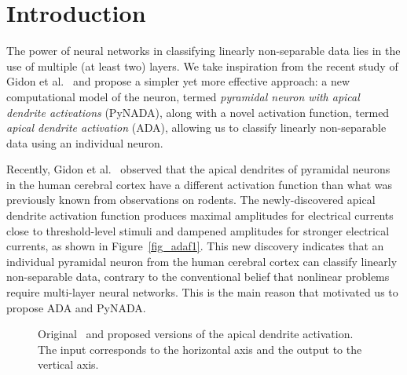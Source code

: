 \documentclass[pdflatex,sn-mathphys]{sn-jnl}
\theoremstyle{thmstyleone}
\theoremstyle{thmstyletwo}\newtheorem{example}{Example}\newtheorem{remark}{Remark}
\theoremstyle{thmstylethree}\newtheorem{definition}{Definition}\DeclareMathOperator{\sinc}{sinc}
\begin{document}





\maketitle

\section{Introduction}
\label{sec_intro}

The power of neural networks \citep{Khan-AIR-2020} in classifying linearly non-separable data lies in the use of multiple (at least two) layers. We take inspiration from the recent study of Gidon et al.~\cite{Gidon-S-2020} and propose a simpler yet more effective approach: a new computational model of the neuron, termed \emph{pyramidal neuron with apical dendrite activations} (PyNADA), along with a novel activation function, termed \emph{apical dendrite activation} (ADA), allowing us to classify linearly non-separable data using an individual neuron.

Recently, Gidon et al.~\cite{Gidon-S-2020} observed that the apical dendrites of pyramidal neurons in the human cerebral cortex have a different activation function than what was previously known from observations on rodents. The newly-discovered apical dendrite activation function produces maximal amplitudes for electrical currents close to threshold-level stimuli and dampened amplitudes for stronger electrical currents, as shown in Figure~\ref{fig_adaf1}. This new discovery indicates that an individual pyramidal neuron from the human cerebral cortex can classify linearly non-separable data, contrary to the conventional belief that nonlinear problems require multi-layer neural networks. This is the main reason that motivated us to propose ADA and PyNADA.

\begin{figure}[!b]
\begin{center}
\centering
{}
\hspace{0.06\linewidth}
\caption{Original~\citep{Gidon-S-2020} and proposed versions of the apical dendrite activation. The input corresponds to the horizontal axis and the output to the vertical axis.}
\label{fig_both_adaf}
\end{center}
\vskip -0.2in
\end{figure}
\end{document}
